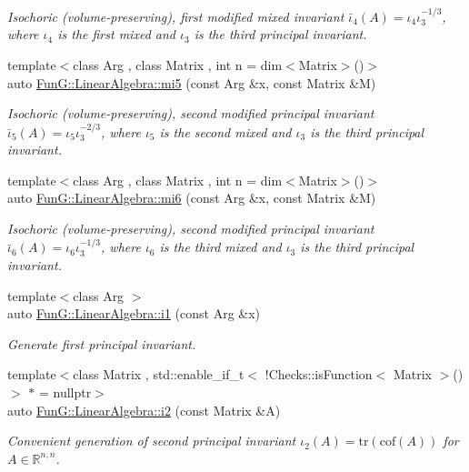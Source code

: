 \begin{DoxyCompactItemize}
\begin{DoxyCompactList}\small\item\em Isochoric (volume-\/preserving), first modified mixed invariant $ \bar\iota_4(A)=\iota_4\iota_3^{-1/3} $, where $\iota_4$ is the first mixed and $\iota_3$ is the third principal invariant. \end{DoxyCompactList}\item 
{\footnotesize template$<$class Arg , class Matrix , int n = dim$<$\+Matrix$>$()$>$ }\\auto \hyperlink{group__InvariantGroup_ga189bc682b34d13902da335c5eb502faa}{Fun\+G\+::\+Linear\+Algebra\+::mi5} (const Arg \&x, const Matrix \&M)
\begin{DoxyCompactList}\small\item\em Isochoric (volume-\/preserving), second modified principal invariant $ \bar\iota_5(A)=\iota_5\iota_3^{-2/3} $, where $\iota_5$ is the second mixed and $\iota_3$ is the third principal invariant. \end{DoxyCompactList}\item 
{\footnotesize template$<$class Arg , class Matrix , int n = dim$<$\+Matrix$>$()$>$ }\\auto \hyperlink{group__InvariantGroup_ga3e451f9e15fa95080f81d0c0f69f93e6}{Fun\+G\+::\+Linear\+Algebra\+::mi6} (const Arg \&x, const Matrix \&M)
\begin{DoxyCompactList}\small\item\em Isochoric (volume-\/preserving), second modified principal invariant $ \bar\iota_6(A)=\iota_6\iota_3^{-1/3} $, where $\iota_6$ is the third mixed and $\iota_3$ is the third principal invariant. \end{DoxyCompactList}\item 
{\footnotesize template$<$class Arg $>$ }\\auto \hyperlink{group__InvariantGroup_gafaead59b618d87239270f8eca2bf75c8}{Fun\+G\+::\+Linear\+Algebra\+::i1} (const Arg \&x)
\begin{DoxyCompactList}\small\item\em Generate first principal invariant. \end{DoxyCompactList}\item 
{\footnotesize template$<$class Matrix , std\+::enable\+\_\+if\+\_\+t$<$ !\+Checks\+::is\+Function$<$ Matrix $>$() $>$ $\ast$  = nullptr$>$ }\\auto \hyperlink{group__InvariantGroup_ga9e442bab8f203bcd5634a3d0e65bf802}{Fun\+G\+::\+Linear\+Algebra\+::i2} (const Matrix \&A)
\begin{DoxyCompactList}\small\item\em Convenient generation of second principal invariant $ \iota_2(A)=\mathrm{tr}(\mathrm{cof}(A)) $ for $A\in\mathbb{R}^{n,n}$. \end{DoxyCompactList}\item 

\end{DoxyCompactItemize}

